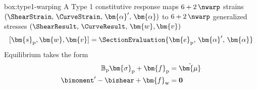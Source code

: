 \vspace{1ex}
\begin{ambox}{box:type1-warping}
A Type 1 constitutive response maps \(6+2\, \nwarp\) strains \((\ShearStrain,\, \CurveStrain,\, \bm{\alpha}',\, \bm{\alpha})\) to \(6+ 2\, \nwarp\) generalized stresses \((\ShearResult,\, \CurveResult,\,\bm{w},\bm{v})\)
\[
[\bm{s}_{\mathrm{p}},\bm{w},\bm{v}] = \SectionEvaluation{\bm{e}_{\mathrm{p}},\, \bm{\alpha}',\, \bm{\alpha}}
\]
Equilibrium takes the form 
\begin{equation}
\begin{aligned}
    \mathbb{B}_{\rm p} \bm{\sigma}_{\mathrm{p}} + \bm{f}_{\mathrm{p}} &= \dot{\bm{\mu}} \\ 
    \bimoment' - \bishear + \bm{f}_{\mathrm{w}} &= \mathbf{0}
\end{aligned}
\end{equation}
\end{ambox}

